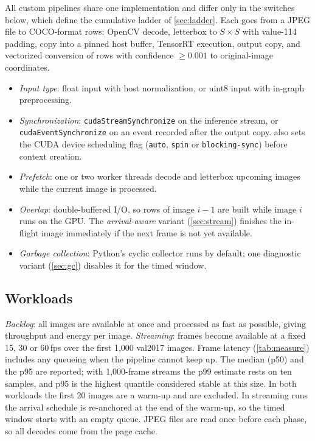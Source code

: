 All custom pipelines share one implementation and differ only in the
switches below, which define the cumulative ladder of
\cref{sec:ladder}. Each goes from a JPEG file to COCO-format rows:
OpenCV decode, letterbox to $S{\times}S$ with value-114 padding,
copy into a pinned host buffer, TensorRT execution, output copy, and
vectorized conversion of rows with confidence $\geq 0.001$ to
original-image coordinates.
\begin{itemize}
\item \emph{Input type}: float input with host normalization, or uint8
  input with in-graph preprocessing.
\item \emph{Synchronization}: \texttt{cudaStreamSynchronize} on the
  inference stream, or \texttt{cudaEventSynchronize} on an event
  recorded after the output copy.  also
  sets the CUDA device scheduling flag (\texttt{auto}, \texttt{spin} or
  \texttt{blocking-sync}) before context creation.
\item \emph{Prefetch}: one or two worker threads decode and letterbox
  upcoming images while the current image is processed.
\item \emph{Overlap}: double-buffered I/O, so rows of image $i{-}1$
  are built while image $i$ runs on the GPU. The \emph{arrival-aware}
  variant (\cref{sec:stream}) finishes the in-flight image immediately
  if the next frame is not yet available.
\item \emph{Garbage collection}: Python's cyclic collector runs by
  default; one diagnostic variant (\cref{sec:gc}) disables it for the
  timed window.
\end{itemize}

\subsection{Workloads}

\emph{Backlog}: all images are available at once and processed as fast
as possible, giving throughput and energy per image. \emph{Streaming}:
frames become available at a fixed 15, 30 or 60\,fps over the first
1,000 val2017 images. Frame latency (\cref{tab:measure}) includes any
queueing when the pipeline cannot keep up. The median (p50) and the p95 are reported; with
1,000-frame streams the p99 estimate rests on ten samples, and p95 is
the highest quantile considered stable at this size. In both workloads
the first 20 images are a warm-up and are excluded. In streaming runs
the arrival schedule is re-anchored at the end of the warm-up, so the
timed window starts with an empty queue. JPEG files are read once
before each phase, so all decodes come from the page cache.

